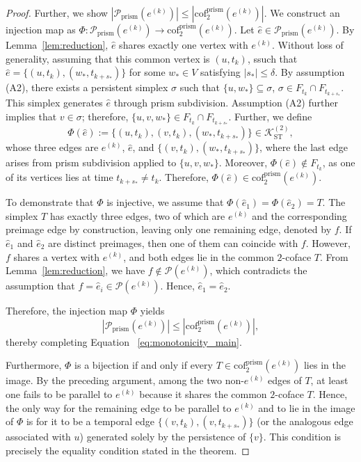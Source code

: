 \documentclass[
    pre,
    twocolumn,
    superscriptaddress,
    showpacs,
    nofootinbib,
    amsmath,
    amssymb,
    floatfix
]{revtex4-2}
\newcommand{\K}{\mathcal{K}}
\theoremstyle{plain} %
\theoremstyle{definition} %
\begin{document}
\begin{proof}
Further, we show $|\mathcal{P}_{\mathrm{prism}}(e^{(k)})| \le |\mathrm{cof}_2^{\mathrm{prism}}(e^{(k)})|$.
We construct an injection map as $\Phi: \mathcal{P}_{\mathrm{prism}}(e^{(k)}) \to \mathrm{cof}_2^{\mathrm{prism}}(e^{(k)})$.
Let $\hat e \in \mathcal{P}_{\mathrm{prism}}(e^{(k)})$.
By Lemma~\ref{lem:reduction}, $\hat e$ shares exactly one vertex with $e^{(k)}$. Without loss of generality, assuming that this common vertex is $(u, t_k)$, ssuch that $\hat e = \{(u, t_k), (w_*, t_{k+s_*})\}$ for some $w_* \in V$ satisfying $|s_*| \le \delta$.
By assumption (A2), there exists a persistent simplex $\sigma$ such that $\{u, w_*\} \subseteq \sigma$, $\sigma \in F_{t_k} \cap F_{t_{k+s_*}}$. This simplex generates $\hat e$ through prism subdivision. Assumption (A2) further implies that $v \in \sigma$; therefore, $\{u, v, w_*\} \in F_{t_k} \cap F_{t_{k+s_*}}$.
Further, we define
\begin{equation*}
\Phi(\hat e) := \{(u, t_k), (v, t_k), (w_*, t_{k+s_*})\} \in \K_{\mathrm{ST}}^{(2)},
\end{equation*}
whose three edges are $e^{(k)}$, $\hat e$, and $\{(v, t_k), (w_*, t_{k+s_*})\}$, where the last edge arises from prism subdivision applied to $\{u, v, w_*\}$.
Moreover, $\Phi(\hat e) \notin F_{t_k}$, as one of its vertices lies at time $t_{k+s_*} \neq t_k$. Therefore, $\Phi(\hat e) \in \mathrm{cof}_2^{\mathrm{prism}}(e^{(k)})$.

To demonstrate that $\Phi$ is injective, we assume that $\Phi(\hat e_1) = \Phi(\hat e_2) = T$.
The simplex $T$ has exactly three edges, two of which are $e^{(k)}$ and the corresponding preimage edge by construction, leaving only one remaining edge, denoted by $f$.
If $\hat e_1$ and $\hat e_2$ are distinct preimages, then one of them can coincide with $f$. However, $f$ shares a vertex with $e^{(k)}$, and both edges lie in the common $2$-coface $T$.
From Lemma~\ref{lem:reduction}, we have $f \notin \mathcal{P}(e^{(k)})$, which contradicts the assumption that $f = \hat e_i \in \mathcal{P}(e^{(k)})$.
Hence, $\hat e_1 = \hat e_2$.

Therefore, the injection map $\Phi$ yields
\begin{equation*}
|\mathcal{P}_{\mathrm{prism}}(e^{(k)})| \le |\mathrm{cof}_2^{\mathrm{prism}}(e^{(k)})|,
\end{equation*}
thereby completing Equation ~\eqref{eq:monotonicity_main}.

Furthermore, $\Phi$ is a bijection if and only if every $T \in \mathrm{cof}_2^{\mathrm{prism}}(e^{(k)})$ lies in the image.
By the preceding argument, among the two non-$e^{(k)}$ edges of $T$, at least one fails to be parallel to $e^{(k)}$ because it shares the common $2$-coface $T$.
Hence, the only way for the remaining edge to be parallel to $e^{(k)}$ and to lie in the image of $\Phi$ is for it to be a temporal edge $\{(v, t_k), (v, t_{k+s_*})\}$ (or the analogous edge associated with $u$) generated solely by the persistence of $\{v\}$.
This condition is precisely the equality condition stated in the theorem.
\end{proof}
\end{document}
